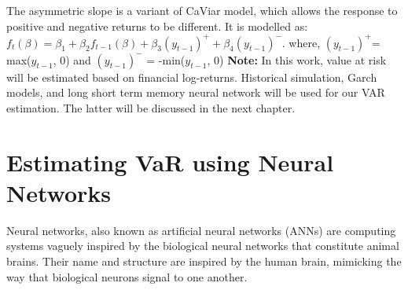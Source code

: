 \documentclass[a4paper,11pt,oneside]{book}
\begin{document}
\newline\newline
The asymmetric slope is a variant of CaViar model, which allows the response to positive and negative returns to be different. It is modelled as:\newline\newline
$f_{t}(\beta)= \beta_{1} +\beta_{2}f_{t-1}(\beta)+\beta_{3}(y_{t-1})^{+} + \beta_{4}(y_{t-1})^{-}$. where, $(y_{t-1})^{+}$= max($y_{t-1}$, 0) and $(y_{t-1})^{-}$ = -min($y_{t-1}$, 0)
\newline\newline
\textbf{Note:} In this work, value at risk will be estimated based on financial log-returns. Historical simulation, Garch models, and long short term memory neural network will be used for our VAR estimation. The latter will be discussed in the next chapter.

\chapter{Estimating VaR using Neural Networks
}
Neural networks, also known as artificial neural networks (ANNs) are computing systems vaguely inspired by the biological neural networks that constitute animal brains. Their name and structure are inspired by the human brain, mimicking the way that biological neurons signal to one another.\newline\newline
\end{document}
